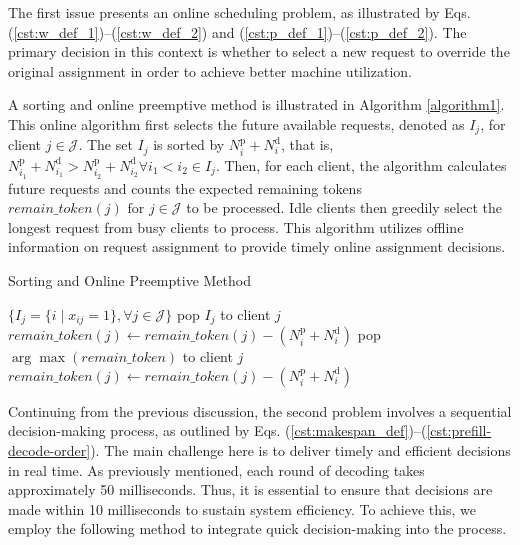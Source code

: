 The first issue presents an online scheduling problem, as illustrated by Eqs. (\ref{cst:w_def_1})--(\ref{cst:w_def_2}) and (\ref{cst:p_def_1})--(\ref{cst:p_def_2}). The primary decision in this context is whether to select a new request to override the original assignment in order to achieve better machine utilization.

A sorting and online preemptive method is illustrated in Algorithm \ref{algorithm1}. This online algorithm first selects the future available requests, denoted as $I_j$, for client $j \in \mathcal{J}$. The set $I_j$ is sorted by $N_i^{\text{p}} + N_i^{\text{d}}$, that is, $N_{i_1}^{\text{p}} + N_{i_1}^{\text{d}}>N_{i_2}^{\text{p}} + N_{i_2}^{\text{d}} \forall i_1<i_2 \in I_j$. Then, for each client, the algorithm calculates future requests and counts the expected remaining tokens $remain\_token(j) \text{ for } j\in \mathcal {J}$ to be processed. Idle clients then greedily select the longest request from busy clients to process. This algorithm utilizes offline information on request assignment to provide timely online assignment decisions.

\begin{algorithm}
\caption{Sorting and Online Preemptive Method}
\label{algorithm1}
\begin{algorithmic}
\Require $\{ I_j = \{ i \mid x_{ij} = 1 \}, \forall j \in \mathcal{J} \}$ 
        \State pop $I_j$ to client $j$
        \State $remain\_token(j) \gets remain\_token(j) - (N_i^{\text{p}} + N_i^{\text{d}})$
        \State pop $\arg\max(remain\_token)$ to client $j$
        \State $remain\_token(j) \gets remain\_token(j) - (N_i^{\text{p}} + N_i^{\text{d}})$
    \EndIf
\EndFor
\end{algorithmic}
\end{algorithm}

Continuing from the previous discussion, the second problem involves a sequential decision-making process, as outlined by Eqs. (\ref{cst:makespan_def})--(\ref{cst:prefill-decode-order}). The main challenge here is to deliver timely and efficient decisions in real time. As previously mentioned, each round of decoding takes approximately 50 milliseconds. Thus, it is essential to ensure that decisions are made within 10 milliseconds to sustain system efficiency. To achieve this, we employ the following method to integrate quick decision-making into the process.

